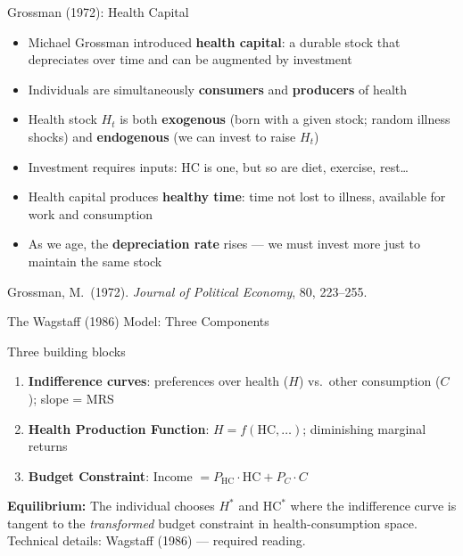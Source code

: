 \documentclass[aspectratio=169, 12pt]{beamer}
\begin{document}
\begin{frame}{Grossman (1972): Health Capital}
  \small
  \begin{itemize}
    \item Michael Grossman introduced \textbf{health capital}: a durable stock that
          depreciates over time and can be augmented by investment
    \item Individuals are simultaneously \textbf{consumers} and \textbf{producers} of health
    \item Health stock $H_t$ is both \textbf{exogenous} (born with a given stock; random
          illness shocks) and \textbf{endogenous} (we can invest to raise $H_t$)
    \item Investment requires inputs: HC is one, but so are diet, exercise, rest\ldots
    \item Health capital produces \textbf{healthy time}: time not lost to illness, available
          for work and consumption
    \item As we age, the \textbf{depreciation rate} rises --- we must invest more just to
          maintain the same stock
  \end{itemize}
  \vspace{0.2em}
  {\footnotesize Grossman, M.\ (1972). \textit{Journal of Political Economy}, 80, 223--255.}
\end{frame}

\begin{frame}{The Wagstaff (1986) Model: Three Components}
  \begin{block}{Three building blocks}
    \small
    \begin{enumerate}
      \item \textbf{Indifference curves}: preferences over health ($H$) vs.\ other consumption ($C$); slope = MRS
      \item \textbf{Health Production Function}: $H = f(\text{HC}, \ldots)$; diminishing marginal returns
      \item \textbf{Budget Constraint}: Income $= P_\text{HC} \cdot \text{HC} + P_C \cdot C$
    \end{enumerate}
  \end{block}
  \vspace{0.4em}
  {\small \textbf{Equilibrium:} The individual chooses $H^*$ and $\text{HC}^*$ where the indifference
  curve is tangent to the \emph{transformed} budget constraint in health-consumption space.}
  \vspace{0.2em}\\
  {\footnotesize Technical details: Wagstaff (1986) --- required reading.}
\end{frame}
\end{document}
